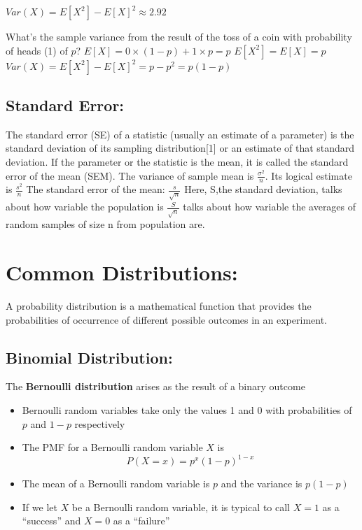 \documentclass[]{article}
\begin{document}
\(Var(X) = E[X^2] - E[X]^2 \approx 2.92\)

What's the sample variance from the result of the toss of a coin with
probability of heads (1) of \(p\)?
\(E[X] = 0 \times (1 - p) + 1 \times p = p\) \(E[X^2] = E[X] = p\)
\(Var(X) = E[X^2] - E[X]^2 = p - p^2 = p(1 - p)\)

\hypertarget{standard-error}{%
\subsection{Standard Error:}\label{standard-error}}

The standard error (SE) of a statistic (usually an estimate of a
parameter) is the standard deviation of its sampling distribution{[}1{]}
or an estimate of that standard deviation. If the parameter or the
statistic is the mean, it is called the standard error of the mean
(SEM). The variance of sample mean is \(\frac{\sigma^2}{n}\). Its
logical estimate is \(\frac{s^2}{n}\) The standard error of the mean:
\(\frac{s}{\sqrt{n}}\) Here, S,the standard deviation, talks about how
variable the population is \(\frac{S}{\sqrt{n}}\) talks about how
variable the averages of random samples of size n from population are.

\hypertarget{common-distributions}{%
\section{Common Distributions:}\label{common-distributions}}

A probability distribution is a mathematical function that provides the
probabilities of occurrence of different possible outcomes in an
experiment.

\hypertarget{binomial-distribution}{%
\subsection{Binomial Distribution:}\label{binomial-distribution}}

The \textbf{Bernoulli distribution} arises as the result of a binary
outcome

\begin{itemize}
\item
  Bernoulli random variables take only the values 1 and 0 with
  probabilities of \(p\) and \(1-p\) respectively
\item
  The PMF for a Bernoulli random variable \(X\) is
  \[P(X = x) =  p^x (1 - p)^{1 - x}\]
\item
  The mean of a Bernoulli random variable is \(p\) and the variance is
  \(p(1 - p)\)
\item
  If we let \(X\) be a Bernoulli random variable, it is typical to call
  \(X=1\) as a ``success'' and \(X=0\) as a ``failure''
\end{itemize}
\end{document}
